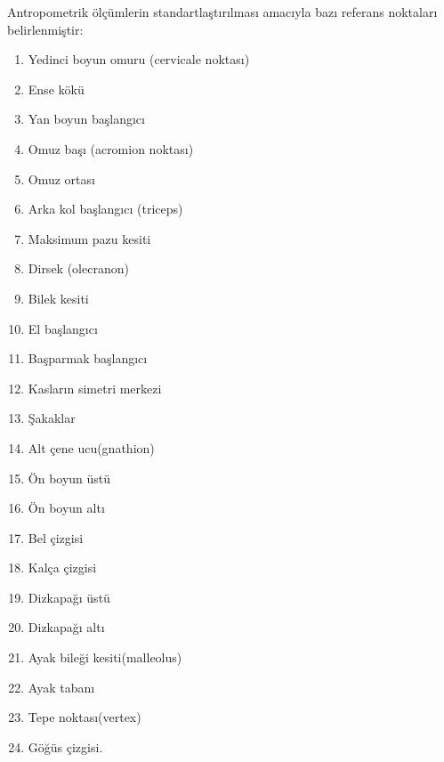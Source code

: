\documentclass[12pt, a4paper]{article}
\begin{document}
Antropometrik ölçümlerin standartlaştırılması amacıyla bazı referans noktaları belirlenmiştir:
\begin{enumerate}
	\item Yedinci boyun omuru (cervicale noktası)
	\item Ense kökü
	\item Yan boyun başlangıcı
	\item Omuz başı (acromion noktası)
	\item Omuz ortası
	\item Arka kol başlangıcı (triceps)
	\item Maksimum pazu kesiti
	\item Dirsek (olecranon)
	\item Bilek kesiti
	\item El başlangıcı
	\item Başparmak başlangıcı
	\item Kasların simetri merkezi
	\item Şakaklar
	\item Alt çene ucu(gnathion)
	\item Ön boyun üstü
	\item Ön boyun altı
	\item Bel çizgisi
	\item Kalça çizgisi
	\item Dizkapağı üstü
	\item Dizkapağı altı
	\item Ayak bileği kesiti(malleolus)
	\item Ayak tabanı
	\item Tepe noktası(vertex)
	\item Göğüs çizgisi\cite{Antropometrik}.
\end{enumerate}
\end{document}
